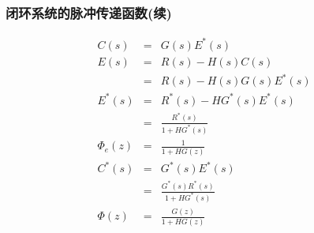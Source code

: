\documentclass[table]{beamer}
\begin{document}
\begin{frame}
\frametitle{闭环系统的脉冲传递函数(续)}
\label{sec-4-4-2}

\begin{eqnarray*}
C(s) &=& G(s)E^*(s) \\
E(s) &=& R(s)-H(s)C(s) \\
 &=& R(s)-H(s)G(s)E^*(s) \\
E^*(s) &=& R^*(s)-HG^*(s)E^*(s)\\
  &=& \frac{R^*(s)}{1+HG^*(s)} \\
\Phi_e(z) &=& \frac{1}{1+HG(z)} \\
C^*(s) &=& G^*(s)E^*(s)\\
 &=& \frac{G^*(s)R^*(s)}{1+HG^*(s)} \\
\Phi(z) &=& \frac{G(z)}{1+HG(z)}
\end{eqnarray*}
\end{frame}
\end{document}
